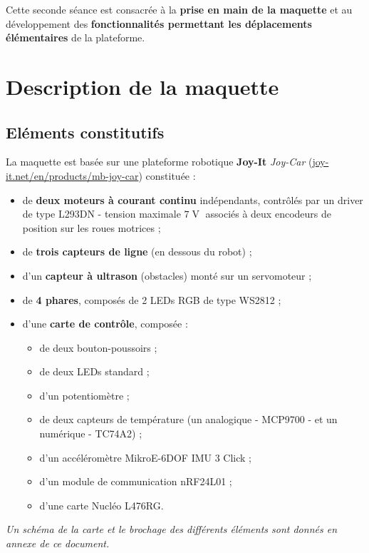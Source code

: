\documentclass[a4paper,11pt,titlepage]{article} %
\begin{document}
Cette seconde séance est consacrée à la \textbf{prise en main de la maquette} et au développement des \textbf{fonctionnalités permettant les déplacements élémentaires} de la plateforme.


\section{Description de la maquette}


\subsection{Eléments constitutifs}

La maquette est basée sur une plateforme robotique \textbf{Joy-It} \textit{Joy-Car} (\href{https://joy-it.net/en/products/mb-joy-car}{joy-it.net/en/products/mb-joy-car}) constituée :

\begin{itemize}
	\item de \textbf{deux moteurs à courant continu} indépendants, contrôlés par un driver de type L293DN - tension maximale $7\operatorname{V}$ associés à deux encodeurs de position sur les roues motrices ;
	\item de \textbf{trois capteurs de ligne} (en dessous du robot) ;
	\item d'un \textbf{capteur à ultrason} (obstacles) monté sur un servomoteur ;
	\item de \textbf{4 phares}, composés de 2 LEDs RGB de type WS2812 ;
	\item d'une \textbf{carte de contrôle}, composée :
	\begin{itemize}
		\item de deux bouton-poussoirs ;
		\item de deux LEDs standard ;
		\item d'un potentiomètre ;
		\item de deux capteurs de température (un analogique - MCP9700 - et un numérique - TC74A2) ;
		\item d'un accéléromètre MikroE-6DOF IMU 3 Click ;
		\item d'un module de communication nRF24L01 ;
		\item d'une carte Nucléo L476RG.
	\end{itemize}
\end{itemize}

\textit{Un schéma de la carte et le brochage des différents éléments sont donnés en annexe de ce document.}
\end{document}
